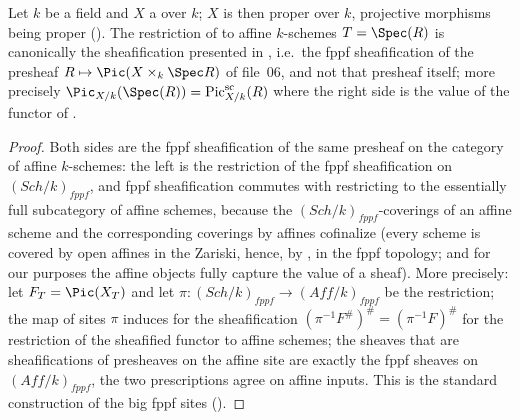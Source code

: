 \begin{lemma}
\label{lem:pc-picard-functor-agrees-sc}
Let $k$ be a field and $X$ a
 over
$k$; $X$ is then proper over $k$, projective morphisms being proper
().  The restriction of
 to affine $k$-schemes
$T=\Spec(R)$ is canonically the sheafification presented in
, i.e.\ the fppf sheafification of the
presheaf $R\mapsto\Pic(X\times_k\Spec R)$ of file~06, and not that
presheaf itself; more precisely
$\Pic_{X/k}(\Spec(R))=\operatorname{Pic}_{X/k}^{\mathrm{sc}}(R)$ where
the right side is the value of the functor of .
\end{lemma}
\begin{proof}
Both sides are the fppf sheafification of the same presheaf on the
category of affine $k$-schemes: the left is the restriction of the fppf
sheafification on $(\mathit{Sch}/k)_{fppf}$, and fppf sheafification
commutes with restricting to the essentially full subcategory of affine
schemes, because the $(\mathit{Sch}/k)_{fppf}$-coverings of an affine
scheme and the corresponding coverings by affines cofinalize (every
scheme is covered by open affines in the Zariski, hence, by
, in the fppf topology;
and for our purposes the affine objects fully capture the value of a
sheaf).  More precisely: let
$F_T=\Pic(X_T)$ and let $\pi:(\mathit{Sch}/k)_{fppf}\to(\mathit{Aff}/k)_{fppf}$
be the restriction; the map of sites $\pi$ induces for the sheafification
$(\pi^{-1}F^\#)^\#=(\pi^{-1}F)^\#$ for the restriction of the sheafified
functor to affine schemes; the sheaves that are sheafifications of
presheaves on the affine site are exactly the fppf sheaves on
$(\mathit{Aff}/k)_{fppf}$, the two prescriptions agree on affine inputs.
This is the standard construction of the big fppf sites
().
\end{proof}

